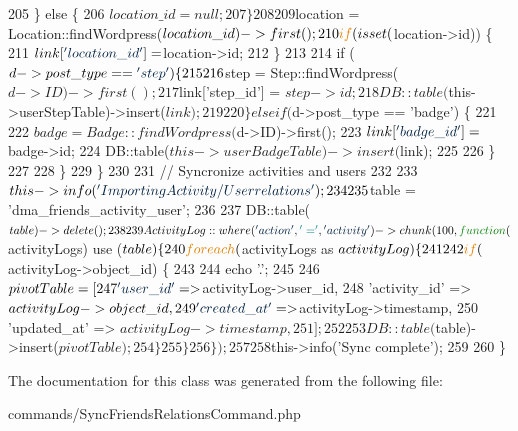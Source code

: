 \begin{DoxyCode}
205                 \} \textcolor{keywordflow}{else} \{
206                     $location\_id = null;
207                 \}
208 
209                 $location = Location::findWordpress($location\_id)->first();
210                 \textcolor{keywordflow}{if} (isset($location->id)) \{
211                     $link[\textcolor{stringliteral}{'location\_id'}] = $location->id;
212                 \}
213 
214                 \textcolor{keywordflow}{if} ($d->post\_type == \textcolor{stringliteral}{'step'}) \{
215 
216                     $step = Step::findWordpress($d->ID)->first();
217                     $link[\textcolor{stringliteral}{'step\_id'}] = $step->id;
218                     DB::table($this->userStepTable)->insert($link);
219 
220                 \} elseif ($d->post\_type == \textcolor{stringliteral}{'badge'}) \{
221 
222                     $badge = Badge::findWordpress($d->ID)->first();
223                     $link[\textcolor{stringliteral}{'badge\_id'}] = $badge->id;
224                     DB::table($this->userBadgeTable)->insert($link);
225 
226                 \}
227         
228             \}
229         \}
230 
231         \textcolor{comment}{// Syncronize activities and users}
232 
233         $this->info(\textcolor{stringliteral}{'Importing Activity/User relations'});
234         
235         $table = \textcolor{stringliteral}{'dma\_friends\_activity\_user'};
236 
237         DB::table($table)->delete();
238 
239         ActivityLog::where(\textcolor{stringliteral}{'action'}, \textcolor{charliteral}{'='}, \textcolor{stringliteral}{'activity'})->chunk(100, \textcolor{keyword}{function}($activityLogs) use ($table) \{
240             \textcolor{keywordflow}{foreach} ($activityLogs as $activityLog) \{
241 
242                 \textcolor{keywordflow}{if} ($activityLog->object\_id) \{
243 
244                     echo \textcolor{charliteral}{'.'};
245 
246                     $pivotTable = [
247                         \textcolor{stringliteral}{'user\_id'}       => $activityLog->user\_id,
248                         \textcolor{stringliteral}{'activity\_id'}   => $activityLog->object\_id,
249                         \textcolor{stringliteral}{'created\_at'}    => $activityLog->timestamp,
250                         \textcolor{stringliteral}{'updated\_at'}    => $activityLog->timestamp,
251                     ];
252 
253                     DB::table($table)->insert($pivotTable);
254                 \}
255             \}
256         \});
257 
258         $this->info(\textcolor{stringliteral}{'Sync complete'});
259 
260     \}
\end{DoxyCode}


The documentation for this class was generated from the following file\-:\begin{DoxyCompactItemize}
\item 
commands/Sync\-Friends\-Relations\-Command.\-php\end{DoxyCompactItemize}

